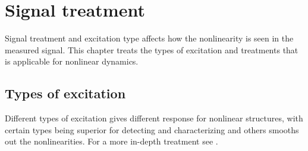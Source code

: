 
\chapter{Signal treatment}
\label{cha:signal-treatment}

Signal treatment and excitation type affects how the nonlinearity is seen in the
measured signal.
This chapter treats the types of excitation and treatments that
is applicable for nonlinear dynamics.

\section{Types of excitation}
\label{sec:types-excitation}

Different types of excitation gives different response for nonlinear structures,
with certain types being superior for detecting and characterizing and others
smooths out the nonlinearities. For a more in-depth treatment see
\autocite{gatto2010flexible}.


